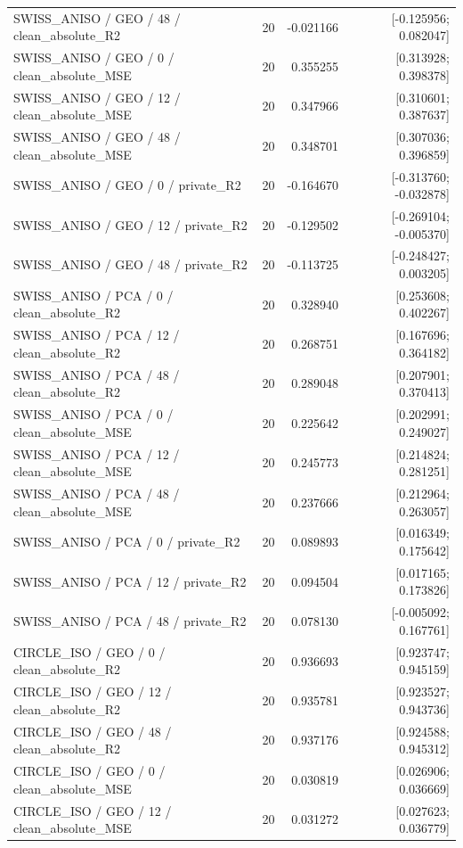\begin{longtable}{p{.56\linewidth}rrr}
SWISS\_ANISO / GEO / 48 / clean\_absolute\_R2 & 20 & -0.021166 & [-0.125956; 0.082047] \\
SWISS\_ANISO / GEO / 0 / clean\_absolute\_MSE & 20 & 0.355255 & [0.313928; 0.398378] \\
SWISS\_ANISO / GEO / 12 / clean\_absolute\_MSE & 20 & 0.347966 & [0.310601; 0.387637] \\
SWISS\_ANISO / GEO / 48 / clean\_absolute\_MSE & 20 & 0.348701 & [0.307036; 0.396859] \\
SWISS\_ANISO / GEO / 0 / private\_R2 & 20 & -0.164670 & [-0.313760; -0.032878] \\
SWISS\_ANISO / GEO / 12 / private\_R2 & 20 & -0.129502 & [-0.269104; -0.005370] \\
SWISS\_ANISO / GEO / 48 / private\_R2 & 20 & -0.113725 & [-0.248427; 0.003205] \\
SWISS\_ANISO / PCA / 0 / clean\_absolute\_R2 & 20 & 0.328940 & [0.253608; 0.402267] \\
SWISS\_ANISO / PCA / 12 / clean\_absolute\_R2 & 20 & 0.268751 & [0.167696; 0.364182] \\
SWISS\_ANISO / PCA / 48 / clean\_absolute\_R2 & 20 & 0.289048 & [0.207901; 0.370413] \\
SWISS\_ANISO / PCA / 0 / clean\_absolute\_MSE & 20 & 0.225642 & [0.202991; 0.249027] \\
SWISS\_ANISO / PCA / 12 / clean\_absolute\_MSE & 20 & 0.245773 & [0.214824; 0.281251] \\
SWISS\_ANISO / PCA / 48 / clean\_absolute\_MSE & 20 & 0.237666 & [0.212964; 0.263057] \\
SWISS\_ANISO / PCA / 0 / private\_R2 & 20 & 0.089893 & [0.016349; 0.175642] \\
SWISS\_ANISO / PCA / 12 / private\_R2 & 20 & 0.094504 & [0.017165; 0.173826] \\
SWISS\_ANISO / PCA / 48 / private\_R2 & 20 & 0.078130 & [-0.005092; 0.167761] \\
CIRCLE\_ISO / GEO / 0 / clean\_absolute\_R2 & 20 & 0.936693 & [0.923747; 0.945159] \\
CIRCLE\_ISO / GEO / 12 / clean\_absolute\_R2 & 20 & 0.935781 & [0.923527; 0.943736] \\
CIRCLE\_ISO / GEO / 48 / clean\_absolute\_R2 & 20 & 0.937176 & [0.924588; 0.945312] \\
CIRCLE\_ISO / GEO / 0 / clean\_absolute\_MSE & 20 & 0.030819 & [0.026906; 0.036669] \\
CIRCLE\_ISO / GEO / 12 / clean\_absolute\_MSE & 20 & 0.031272 & [0.027623; 0.036779] \\

\end{longtable}

